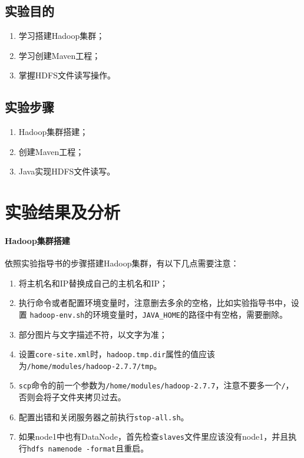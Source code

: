 \documentclass[lang=cn,11pt,a4paper,cite=authornum]{paper}
\begin{document}
\subsection{实验目的}

\begin{enumerate}
    \item 学习搭建Hadoop集群；
    \item 学习创建Maven工程；
    \item 掌握HDFS文件读写操作。
\end{enumerate}

\subsection{实验步骤}

\begin{enumerate}
    \item Hadoop集群搭建；
    \item 创建Maven工程；
    \item Java实现HDFS文件读写。
\end{enumerate}

\section{实验结果及分析}

\paragraph{Hadoop集群搭建}

依照实验指导书的步骤搭建Hadoop集群，有以下几点需要注意：

\begin{enumerate}
    \item 将主机名和IP替换成自己的主机名和IP；
    \item 执行命令或者配置环境变量时，注意删去多余的空格，比如实验指导书中，设置
    \texttt{hadoop-env.sh}的环境变量时，\texttt{JAVA_HOME}的路径中有空格，需要删除。
    \item 部分图片与文字描述不符，以文字为准；
    \item 设置\texttt{core-site.xml}时，\texttt{hadoop.tmp.dir}属性的值应该为\texttt{/home/modules/hadoop-2.7.7/tmp}。
    \item \texttt{scp}命令的前一个参数为\texttt{/home/modules/hadoop-2.7.7}，注意不要多一个\texttt{/}，否则会将子文件夹拷贝过去。
    \item 配置出错和关闭服务器之前执行\texttt{stop-all.sh}。
    \item 如果node1中也有DataNode，首先检查\texttt{slaves}文件里应该没有node1，并且执行\texttt{hdfs namenode -format}且重启。
\end{enumerate}
\end{document}

